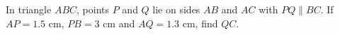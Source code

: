 In triangle $ABC$, points $P$ and $Q$ lie on sides $AB$ and $AC$ with $PQ\parallel BC$. If $AP=1.5$ cm, $PB=3$ cm and $AQ=1.3$ cm, find $QC$.
